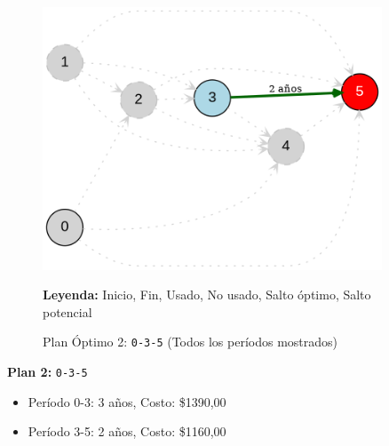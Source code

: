 \documentclass[12pt]{article}
\begin{document}
\begin{figure}[H]
\centering
\includegraphics[width=0.9\textwidth]{Remplazo1111_plan_2.png}
\caption{Plan Óptimo 2: \texttt{0-3-5} (Todos los períodos mostrados)}
\textbf{Leyenda:} \textcolor{green}{\bullet} Inicio, \textcolor{red}{\bullet} Fin, \textcolor{blue}{\bullet} Usado, \textcolor{gray}{\bullet} No usado, \textcolor{darkgreen}{\rightarrow} Salto óptimo, \textcolor{gray}{\dashrightarrow} Salto potencial
\label{fig:plan2}
\end{figure}

\textbf{Plan 2:} \texttt{0-3-5}
\begin{itemize}\small
\item Período 0-3: 3 años, Costo: \$1390,00
\item Período 3-5: 2 años, Costo: \$1160,00
\end{itemize}
\end{document}
